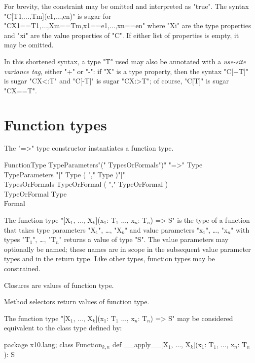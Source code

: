 For brevity, the constraint may be omitted and
interpreted as \xcd"true".
The syntax 
\xcd"C[T1,...,Tm](e1,...,en)" is sugar for
\xcd"C{X1==T1,...,Xm==Tm,x1==e1,...,xn==en}"
where \xcd"Xi" are the type properties and \xcd"xi" are the
value properties of \xcd"C".  
If either list of properties is empty, it may be omitted.

In this shortened syntax, a type \xcd"T" used may also be annotated
with
a \emph{use-site variance tag}, either \xcd"+" or \xcd"-":
if \xcd"X" is a type property, then
the syntax \xcd"C[+T]" is sugar \xcd"C{X<:T}" and
\xcd"C[-T]" is sugar \xcd"C{X:>T}"; of course,
\xcd"C[T]" is sugar \xcd"C{X==T}".

\section{Function types}

The \xcd"=>" type constructor instantiates a function type.

\begin{grammar}
FunctionType \: TypeParameters\opt \xcd"(" TypesOrFormals\opt \xcd")" \xcd"=>" Type  \\
TypeParameters \: \xcd"[" Type ( \xcd"," Type )\star \xcd"]" \\
TypesOrFormals \: TypeOrFormal ( \xcd"," TypeOrFormal )\star \\
TypeOrFormal   \: Type \\
               \| Formal \\
\end{grammar}

The function type
\xcdmath"[X$_1$, $\dots$, X$_k$](x$_1$: T$_1$ $\dots$, x$_n$: T$_n$) => S"
is the type of a function that takes type parameters
\xcdmath"X$_1$", \dots, \xcdmath"X$_k$"
and value parameters
\xcdmath"x$_1$", \dots, \xcdmath"x$_n$"
with types
\xcdmath"T$_1$", \dots, \xcdmath"T$_n$"
returns a value of type \xcd"S".  The value parameters may
optionally be named; these names are in scope in the subsequent
value parameter types and in the return type.
Like other types, function types may be constrained.

Closures are values of function type.

Method selectors return values of function type.

The function type
\xcdmath"[X$_1$, $\dots$, X$_k$](x$_1$: T$_1$ $\dots$, x$_n$: T$_n$) => S"
may be considered equivalent to the class type defined by:
\begin{xtenmath}
package x10.lang;
class Function$_{k,n}$ {
    def __apply__[X$_1$, $\dots$, X$_k$](x$_1$: T$_1$, $\dots$, x$_n$: T$_n$): S
}
\end{xtenmath}

